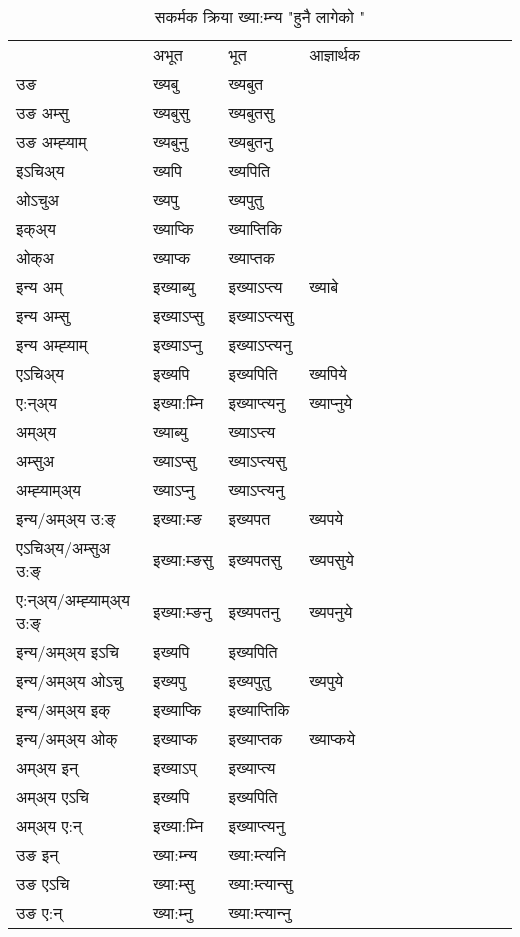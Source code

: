 \begin{table}[H]
\centering
\caption{\label{ɛp.vt} सकर्मक क्रिया  ख्या:म्‍न्य  "हुनै लागेको "  }
\begin{tabular}{l|l|l|l|l|l|l|l|l|l|l|l|l}  \toprule
&अभूत & भूत & आज्ञार्थक \\ 
उङ &ख्यबु &ख्यबुत \\ 
उङ अम्सु &ख्यबुसु &ख्यबुतसु \\ 
उङ अम्ह्‍याम् &ख्यबुनु &ख्यबुतनु \\ 
इऽचिअ्य &ख्यपि &ख्यपिति   \\ 
ओऽचुअ &ख्यपु &ख्यपुतु   \\ 
इक्अ्य &ख्याप्कि &ख्याप्‍तिकि   \\ 
ओक्अ &ख्याप्क &ख्याप्‍तक   \\ 
इन्य अम् & इख्याब्यु  & इख्याऽप्‍त्य &ख्याबे  \\ 
इन्य अम्सु & इख्याऽप्सु  & इख्याऽप्‍त्यसु   \\ 
इन्य अम्ह्‍याम् & इख्याऽप्‍नु  & इख्याऽप्‍त्यनु   \\ 
एऽचिअ्य & इख्यपि & इख्यपिति &ख्यपिये    \\ 
ए:न्अ्य & इख्या:म्‍नि  & इख्याप्‍त्यनु &ख्याप्‍नुये  \\ 
अम्अ्य & ख्याब्यु  & ख्याऽप्‍त्य  \\ 
अम्सुअ & ख्याऽप्सु & ख्याऽप्‍त्यसु  \\ 
अम्ह्‍याम्अ्य & ख्याऽप्‍नु  & ख्याऽप्‍त्यनु \\ 
\midrule
इन्य/अम्अ्य उ:ङ्‌&इख्या:म्ङ & इख्यपत &ख्यपये \\ 
एऽचिअ्य/अम्सुअ उ:ङ्‌ &इख्या:म्ङसु & इख्यपतसु &ख्यपसुये \\ 
ए:न्अ्य/अम्ह्‍याम्अ्य उ:ङ्‌ &इख्या:म्ङनु & इख्यपतनु &ख्यपनुये \\ 
इन्य/अम्अ्य इऽचि & इख्यपि & इख्यपिति    \\ 
इन्य/अम्अ्य ओऽचु & इख्यपु & इख्यपुतु  &ख्यपुये  \\ 
इन्य/अम्अ्य इक् & इख्याप्कि & इख्याप्‍तिकि   \\ 
इन्य/अम्अ्य ओक् & इख्याप्क & इख्याप्‍तक  &ख्याप्कये  \\ 
अम्अ्य इन् & इख्याऽप् & इख्याप्‍त्य   \\ 
अम्अ्य एऽचि & इख्यपि & इख्यपिति    \\ 
अम्अ्य ए:न् & इख्या:म्‍नि  & इख्याप्‍त्यनु  \\ 
\midrule
उङ इन् & ख्या:म्‍न्य  & ख्या:म्त्यनि  \\ 
उङ एऽचि & ख्या:म्सु  & ख्या:म्त्यान्सु   \\ 
उङ ए:न्& ख्या:म्‍नु  & ख्या:म्त्यान्‍नु   \\ 
\bottomrule
\end{tabular}
\end{table}



